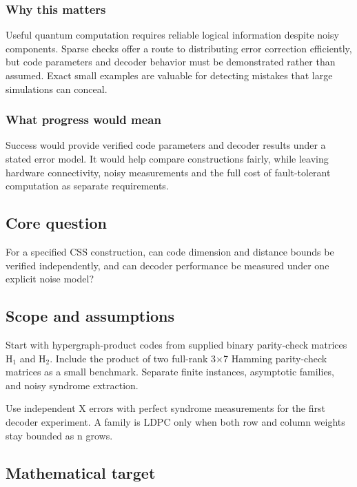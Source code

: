 \documentclass[
  11pt,
]{article}
\begin{document}
\subsubsection{Why this matters}

Useful quantum computation requires reliable logical information despite
noisy components. Sparse checks offer a route to distributing error
correction efficiently, but code parameters and decoder behavior must be
demonstrated rather than assumed. Exact small examples are valuable for
detecting mistakes that large simulations can conceal.

\subsubsection{What progress would mean}

Success would provide verified code parameters and decoder results under
a stated error model. It would help compare constructions fairly, while
leaving hardware connectivity, noisy measurements and the full cost of
fault-tolerant computation as separate requirements.

\subsection{Core question}

For a specified CSS construction, can code dimension and distance bounds
be verified independently, and can decoder performance be measured under
one explicit noise model?

\subsection{Scope and assumptions}

Start with hypergraph-product codes from supplied binary parity-check
matrices H\ensuremath{{}_{1}} and H\ensuremath{{}_{2}}. Include the
product of two full-rank 3\ensuremath{\times}7 Hamming parity-check
matrices as a small benchmark. Separate finite instances, asymptotic
families, and noisy syndrome extraction.

Use independent X errors with perfect syndrome measurements for the
first decoder experiment. A family is LDPC only when both row and column
weights stay bounded as n grows.

\subsection{Mathematical target}
\end{document}
